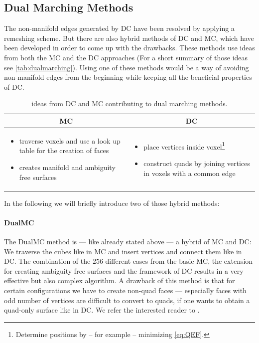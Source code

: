 \subsection*{Dual Marching Methods}
The non-manifold edges generated by \ac{DC} have been resolved by applying a remeshing scheme. But there are also hybrid methods of \ac{DC} and \ac{MC}, which have been developed in order to come up with the drawbacks. These methods use ideas from both the \ac{MC} and the \ac{DC} approaches (For a short summary of those ideas see \autoref{tab:dualmarching}). Using one of these methods would be a way of avoiding non-manifold edges from the beginning while keeping all the beneficial properties of \ac{DC}.
\begin{table}[H]
\begin{tabularx}{\textwidth}{X|X}
\multicolumn{1}{c|}{\acl{MC}} 
    & \multicolumn{1}{c}{\acl{DC}} 
\\
\hline
\begin{itemize}[ topsep = 0pt, leftmargin=1em]
\item traverse voxels and use a look up table for the creation of faces
\item creates manifold and ambiguity free surfaces
\end{itemize}
&
\begin{itemize}[ topsep = 0pt, leftmargin=1em]
\item place vertices inside voxel\footnote{Determine positions by -- for example -- minimizing \autoref{eq:QEF}.}
\item construct \acp{quad} by joining vertices in voxels with a common edge
\end{itemize}
\end{tabularx}
\caption{ideas from \ac{DC} and \ac{MC} contributing to dual marching methods.}
\label{tab:dualmarching}
\end{table}
In the following we will briefly introduce two of those hybrid methods:

\paragraph*{\acl{DualMC}}
The \acf{DualMC} method is --- like already stated above --- a hybrid of \ac{MC} and \ac{DC}: We traverse the cubes like in \ac{MC} and insert vertices and connect them like in \ac{DC}. The combination of the $256$ different cases from the basic \ac{MC}, the extension for creating ambiguity free surfaces and the framework of \ac{DC} results in a very effective but also complex algorithm. A drawback of this method is that for certain configurations we have to create non-\ac{quad} faces --- especially faces with odd number of vertices are difficult to convert to \acp{quad}, if one wants to obtain a \ac{quad}-only surface like in \ac{DC}. We refer the interested reader to  \cite{Nielson2004, Zhang2012}.

